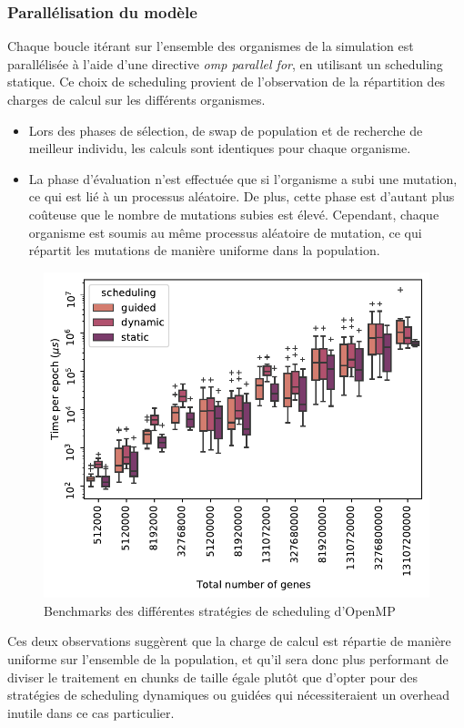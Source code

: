 \documentclass[a4paper, 10pt, twoside]{article}
\begin{document}
\subsubsection{Parallélisation du modèle}

Chaque boucle itérant sur l'ensemble des organismes de la simulation est parallélisée à l'aide d'une directive \textit{omp parallel for}, en utilisant un scheduling statique. Ce choix de scheduling provient de l'observation de la répartition des charges de calcul sur les différents organismes.

\begin{itemize}
	\item Lors des phases de sélection, de swap de population et de recherche de meilleur individu, les calculs sont identiques pour chaque organisme.
	\item La phase d'évaluation n'est effectuée que si l'organisme a subi une mutation, ce qui est lié à un processus aléatoire. De plus, cette phase est d'autant plus coûteuse que le nombre de mutations subies est élevé. Cependant, chaque organisme est soumis au même processus aléatoire de mutation, ce qui répartit les mutations de manière uniforme dans la population.
\end{itemize}


\begin{figure}[htb]
	\centering
	\includegraphics[width=0.5\linewidth]{img/scheduling_strategies.pdf}
	\caption{Benchmarks des différentes stratégies de scheduling d'OpenMP}
	\label{fig:benchmarks/scheduling}
\end{figure}

Ces deux observations suggèrent que la charge de calcul est répartie de manière uniforme sur l'ensemble de la population, et qu'il sera donc plus performant de diviser le traitement en chunks de taille égale plutôt que d'opter pour des stratégies de scheduling dynamiques ou guidées qui nécessiteraient un overhead inutile dans ce cas particulier.
\end{document}
